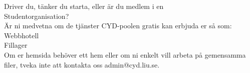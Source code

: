 \documentclass[a4paper,12pt]{article}
\begin{document}
\linespread{2}
\centering

\mbox{}
\vspace{0.1cm}


\fontsize{26}{20}\selectfont\normalfont
Driver du, tänker du starta, eller är du medlem i en
\\
\vspace{0.3cm}
\fontsize{40}{40}\selectfont\normalfont
Student\-organisation?
\\
\vspace{1.5cm}
\fontsize{26}{20}\selectfont\normalfont
Är ni medvetna om de tjänster CYD-poolen gratis kan erbjuda er så som:
\\
\vspace{0.3cm}
\fontsize{40}{40}\selectfont\normalfont
Webbhotell\\
Fillager
\\
\vspace{1.5cm}
\fontsize{26}{20}\selectfont\normalfont
Om er hemsida behöver ett hem eller om ni enkelt vill arbeta på
gemensamma filer, tveka inte att kontakta oss admin@cyd.liu.se.
\end{document}
